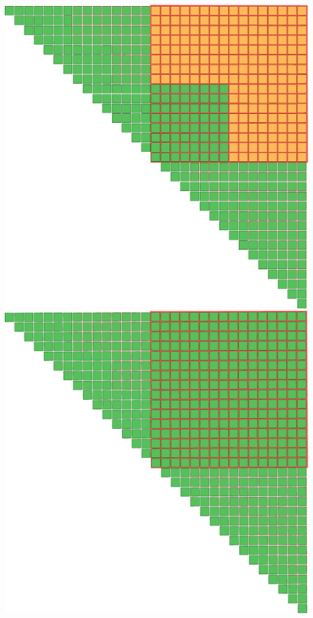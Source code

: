 \documentclass[xcolor=table]{beamer}
\begin{document}
\begin{frame}[fragile]
\begin{overprint}
        \vspace{-130}\hspace{165}\includegraphics[width = 0.5\linewidth, right]{pic/04.pdf}
        \vspace{-130}\hspace{165}\includegraphics[width = 0.5\linewidth, right]{pic/05.pdf}
    \end{overprint}
    
\end{frame}
\end{document}
